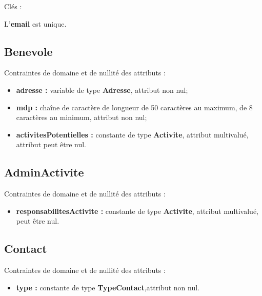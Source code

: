 \documentclass[asi, sansVersion]{picInsa}
\begin{document}
Clés : 

L'\textbf{email} est unique.\\

\subsection*{Benevole}
Contraintes de domaine et de nullité des attributs :
\begin{itemize}
 	\item \textbf{adresse :} variable de type \textbf{Adresse}, attribut non nul;
	\item \textbf{mdp :} chaîne de caractère de longueur de 50 caractères au maximum, de 8 caractères au minimum, attribut non nul;  
	\item \textbf{activitesPotentielles :} constante de type \textbf{Activite}, attribut multivalué, attribut  peut être nul.\\
\end{itemize}  

\subsection*{AdminActivite}
Contraintes de domaine et de nullité des attributs :
\begin{itemize}
\item \textbf{responsabilitesActivite :} constante de type \textbf{Activite}, attribut multivalué, peut être nul.\\
\end{itemize}

 
\subsection*{Contact}
Contraintes de domaine et de nullité des attributs :
 \begin{itemize}
 \item \textbf{type :} constante de type \textbf{TypeContact},attribut non nul.\\
 \end{itemize}
\end{document}
